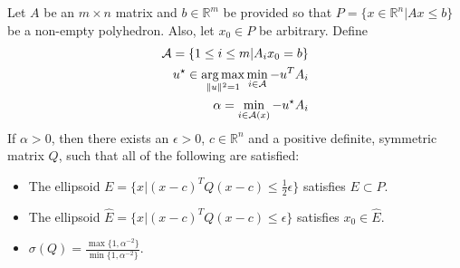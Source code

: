 
\begin{lemma}
\label{ellipsoid_exists}
Let  $A$ be an $m \times n$ matrix and $b \in \mathbb R^m$ be provided so that $P = \{x \in \mathbb R^n | Ax \le b \}$ be a non-empty polyhedron.
Also, let $x_0 \in P$ be arbitrary.
Define
\begin{align}
\mathcal A = \{1 \le i \le m | A_i x_0 = b \} \label{active_polyhedron_constraints} \\
u^{\star} \in \operatorname*{arg\,max}_{\|u\|^2 = 1} \min_{i \in \mathcal A} - u^T A_i \label{polyhedrons_u} \\
\alpha = \min_{i \in \mathcal A(x)} -u^{\star}A_i \label{polyhedrons_alpha}
\end{align}
If $\alpha > 0$, then there exists an $\epsilon > 0$, $c \in \mathbb R^n$  and a positive definite, symmetric matrix $Q$, 
such that all of the following are satisfied:
\begin{itemize}
\item The ellipsoid $E = \{x | (x - c)^TQ(x - c) \le \frac 1 2 \epsilon \}$ satisfies $E \subset P$.
\item The ellipsoid $\hat E = \{x | (x - c)^TQ(x - c) \le  \epsilon \}$ satisfies $x_0 \in \hat E$.
\item $\sigma(Q) = \frac{\max\{1, \alpha^{-2}\}}{\min\{1, \alpha^{-2}\}}$.
\end{itemize}
\end{lemma}

